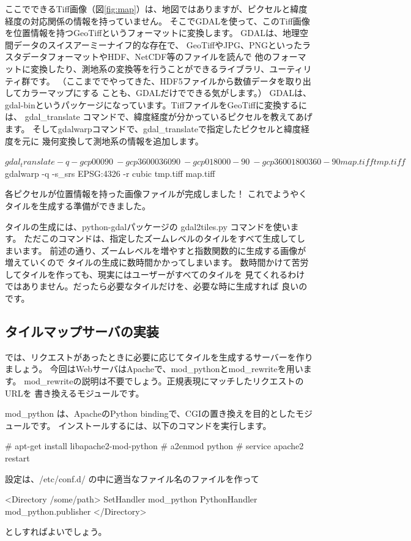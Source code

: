 \documentclass[mingoth,a4paper]{jsarticle}
\begin{document}
ここでできるTiff画像（図\ref{fig:map}）は、地図ではありますが、ピクセルと緯度経度の対応関係の情報を持っていません。
そこでGDALを使って、このTiff画像を位置情報を持つGeoTiffというフォーマットに変換します。
GDALは、地理空間データのスイスアーミーナイフ的な存在で、
GeoTiffやJPG、PNGといったラスタデータフォーマットやHDF、NetCDF等のファイルを読んで
他のフォーマットに変換したり、測地系の変換等を行うことができるライブラリ、ユーティリティ群です。
（ここまででやってきた、HDF5ファイルから数値データを取り出してカラーマップにする
ことも、GDALだけでできる気がします。）
GDALは、gdal-binというパッケージになっています。TiffファイルをGeoTiffに変換するには、
gdal\_translate コマンドで、緯度経度が分かっているピクセルを教えてあげます。
そしてgdalwarpコマンドで、gdal\_translateで指定したピクセルと緯度経度を元に
幾何変換して測地系の情報を追加します。
%
\begin{commandline}
$ gdal_translate -q -gcp 0 0 0 90 \
                -gcp 3600 0 360 90 \
                -gcp 0 1800 0 -90 \
                -gcp 3600 1800 360 -90 map.tiff tmp.tiff

$ gdalwarp -q -s_srs EPSG:4326 -r cubic tmp.tiff map.tiff
\end{commandline}
%
各ピクセルが位置情報を持った画像ファイルが完成しました！
これでようやくタイルを生成する準備ができました。

タイルの生成には、python-gdalパッケージの gdal2tiles.py コマンドを使います。
ただこのコマンドは、指定したズームレベルのタイルをすべて生成してしまいます。
前述の通り、ズームレベルを増やすと指数関数的に生成する画像が増えていくので
タイルの生成に数時間かかってしまいます。
数時間かけて苦労してタイルを作っても、現実にはユーザーがすべてのタイルを
見てくれるわけではありません。だったら必要なタイルだけを、必要な時に生成すれば
良いのです。

\subsection{タイルマップサーバの実装}
では、リクエストがあったときに必要に応じてタイルを生成するサーバーを作りましょう。
今回はWebサーバはApacheで、mod\_pythonとmod\_rewriteを用います。
mod\_rewriteの説明は不要でしょう。正規表現にマッチしたリクエストのURLを
書き換えるモジュールです。

mod\_python は、ApacheのPython bindingで、CGIの置き換えを目的としたモジュールです。
インストールするには、以下のコマンドを実行します。
\begin{commandline}
# apt-get install libapache2-mod-python
# a2enmod python
# service apache2 restart
\end{commandline}
設定は、/etc/conf.d/ の中に適当なファイル名のファイルを作って
\begin{commandline}
<Directory /some/path>
  SetHandler mod_python
  PythonHandler mod_python.publisher
</Directory>
\end{commandline}
としすればよいでしょう。
\end{document}
